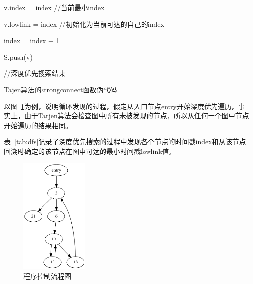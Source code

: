  
\begin{algorithm}[htb]
  \small
  \SetAlgoLined
   v.index = index //当前最小index
   
   v.lowlink = index //初始化为当前可达的自己的index
   
   index = index + 1
   
   S.push(v)
 
   //深度优先搜索结束
   
  \caption{Tajen算法的strongconnect函数伪代码}    
  \label{algo:strongconnect}
\end{algorithm}

以图~\ref{fig:dfs}为例，说明循环发现的过程，假定从入口节点entry开始深度优先遍历，事实上，由于Tarjen算法会检查图中所有未被发现的节点，所以从任何一个图中节点开始遍历的结果相同。

表~\ref{tab:dfs}记录了深度优先搜索的过程中发现各个节点的时间戳index和从该节点回溯时确定的该节点在图中可达的最小时间戳lowlink值。

\begin{figure}[htb]
  \centering
  \includegraphics[width=0.3\textwidth]{figures/cfg.pdf}
  \caption{程序控制流程图}
  \label{fig:dfs}
\end{figure}


